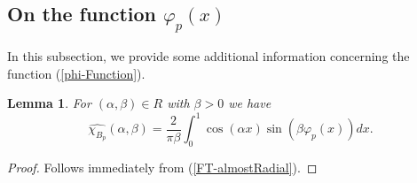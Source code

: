 \documentclass{amsart}
\newtheorem{lem}[theorem]{Lemma}
\numberwithin{equation}{section}
\begin{document}
\subsection{On the function $\varphi_p(x)$}
In this subsection, we provide some additional information concerning the function (\ref{phi-Function}).
\begin{lem}
\label{FourierBallLemma}
For $(\alpha,\beta)\in R$ with $\beta>0$ we have
\begin{equation}
    \label{FourierBallEq1}
    \widehat{\chi_{B_p}}(\alpha,\beta)=\frac{2}{\pi\beta}\int_0^1\cos(\alpha x)\sin(\beta\varphi_p(x))dx.
\end{equation}
\end{lem}
\begin{proof}
Follows immediately from (\ref{FT-almostRadial}).
\end{proof}
\end{document}
